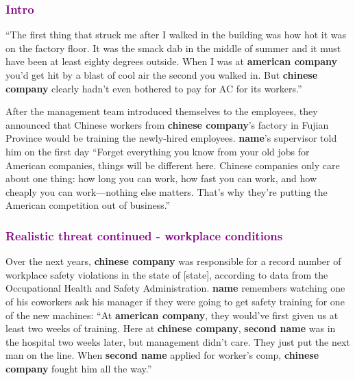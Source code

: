 \documentclass[12pt]{article}
\begin{document}
\subsubsection{\textcolor{purple}{Intro}}

 ``The first thing that struck me after I walked in the building was how hot it was on the factory floor. It was the smack dab in the middle of summer and it must have been at least eighty degrees outside. When I was at \textbf{american company} you'd get hit by a blast of cool air the second you walked in. But \textbf{chinese company} clearly hadn't even bothered to pay for AC for its workers.''

After the management team introduced themselves to the employees, they announced that Chinese workers from \textbf{chinese company}'s factory in Fujian Province would be training the newly-hired employees. \textbf{name}'s supervisor told him on the first day ``Forget everything you know from your old jobs for American companies, things will be different here. Chinese companies only care about one thing: how long you can work, how fast you can work, and how cheaply you can work---nothing else matters. That's why they're putting the American competition out of business.''


\subsubsection{\textcolor{purple}{Realistic threat continued - workplace conditions}}
Over the next years, \textbf{chinese company} was responsible for a record number of workplace safety violations in the state of [state], according to data from the Occupational Health and Safety Administration. \textbf{name} remembers watching one of his coworkers ask his manager if they were going to get safety training for one of the new machines: ``At \textbf{american company}, they would've first given us at least two weeks of training. Here at \textbf{chinese company}, \textbf{second name} was in the hospital two weeks later, but management didn't care. They just put the next man on the line. When \textbf{second name} applied for worker's comp, \textbf{chinese company} fought him all the way.''
\end{document}
